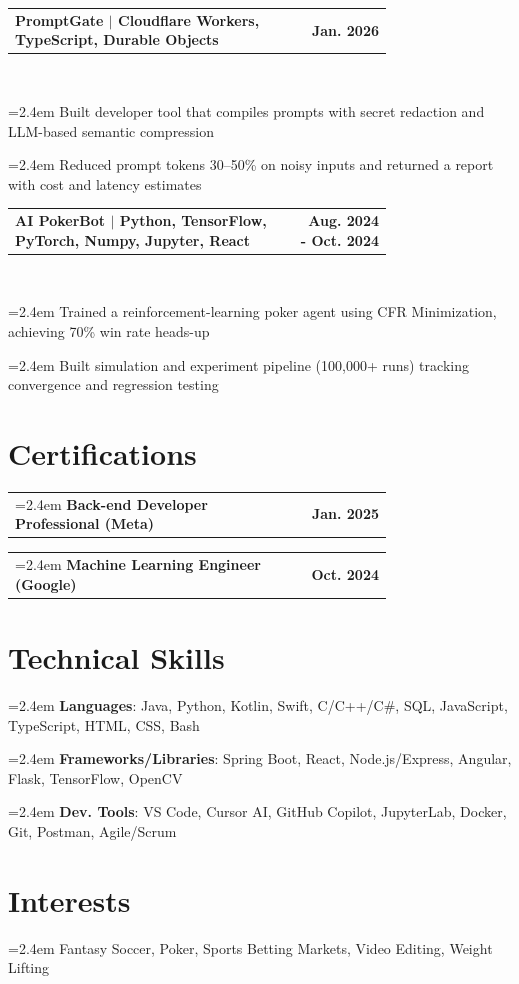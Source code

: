 \documentclass[letterpaper,11pt]{article}
\makeatletter
\newcommand{\LeftRight}[2]{%
  \begin{tabular*}{\linewidth}{@{\extracolsep{\fill}} p{0.75\linewidth} r}
    #1 & #2 \\
  \end{tabular*}
}
\newcommand{\Bitem}[1]{%
  \par\hangindent=2.4em\hangafter=1
  \noindent\hspace{1em}%
  \makebox[1.4em][l]{\raisebox{0.2ex}{\scriptsize$\bullet$}}#1\\[-2pt]%
}
\newcommand{\BitemEd}[1]{%
  \hangindent=2.4em\hangafter=1
  \hspace{1em}%
  \makebox[1.4em][l]{\raisebox{0.2ex}{\scriptsize$\bullet$}}%
  #1%
}
\makeatother
\begin{document}
\vspace{7pt}

\LeftRight{\textbf{PromptGate $|$ Cloudflare Workers, TypeScript, Durable Objects}}{\textbf{Jan. 2026}} \\
\Bitem{Built developer tool that compiles prompts with secret redaction and LLM-based semantic compression}
\Bitem{Reduced prompt tokens 30--50\% on noisy inputs and returned a report with cost and latency estimates}


\vspace{7pt}

\LeftRight{\textbf{AI PokerBot $|$ Python, TensorFlow, PyTorch, Numpy, Jupyter, React}}{\textbf{Aug. 2024 - Oct. 2024}} \\
\Bitem{Trained a reinforcement-learning poker agent using CFR Minimization, achieving 70\% win rate heads-up}
\Bitem{Built simulation and experiment pipeline (100,000+ runs) tracking convergence and regression testing}

\section{Certifications}

\LeftRight{\BitemEd{\textbf{Back-end Developer Professional (Meta)}}}{\textbf{Jan. 2025}}
\LeftRight{\BitemEd{\textbf{Machine Learning Engineer (Google)}}}{\textbf{Oct. 2024}}
\vspace{-12pt}

\section{Technical Skills}
     \Bitem{\textbf{Languages}{: Java, Python, Kotlin, Swift, C/C++/C\#, SQL, JavaScript, TypeScript, HTML, CSS, Bash}}
     \Bitem{\textbf{Frameworks/Libraries}{: Spring Boot, React, Node.js/Express, Angular, Flask, TensorFlow, OpenCV}}
     \Bitem{\textbf{Dev. Tools}{: VS Code, Cursor AI, GitHub Copilot, JupyterLab, Docker, Git, Postman, Agile/Scrum}}

\section{Interests}
    \Bitem{Fantasy Soccer, Poker, Sports Betting Markets, Video Editing, Weight Lifting}
     

%


\end{document}
